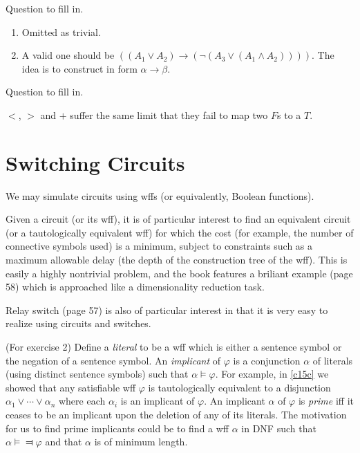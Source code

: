 \begin{exercise}
  Question to fill in.
\end{exercise}

\begin{enumerate}[label=(\alph*)]
  \item Omitted as trivial.
  \item A valid one should be $((A_1\vee A_2)\rightarrow(\neg(A_3\vee(A_1\wedge A_2))))$. The idea is to construct in form $\alpha\rightarrow \beta$.
\end{enumerate}

\begin{exercise}
  Question to fill in.
\end{exercise}

$<$, $>$ and $+$ suffer the same limit that they fail to map two $F$s to a $T$.

\section{Switching Circuits}

We may simulate circuits using wffs (or equivalently, Boolean functions).

Given a circuit (or its wff), it is of particular interest to find an equivalent circuit (or a tautologically equivalent wff) for which the cost (for example, the number of connective symbols used) is a minimum, subject to constraints such as a maximum allowable delay (the depth of the construction tree of the wff). This is easily a highly nontrivial problem, and the book features a briliant example (page 58) which is approached like a dimensionality reduction task.

Relay switch (page 57) is also of particular interest in that it is very easy to realize using circuits and switches.

(For exercise 2) Define a \textit{literal} to be a wff which is either a sentence symbol or the negation of a sentence symbol. An \textit{implicant} of $\varphi$ is a conjunction $\alpha$ of literals (using distinct sentence symbols) such that $\alpha\vDash \varphi$. For example, in \ref{c15c} we showed that any satisfiable wff $\varphi$ is tautologically equivalent to a disjunction $\alpha_1\vee\cdots\vee \alpha_n$ where each $\alpha_i$ is an implicant of $\varphi$. An implicant $\alpha$ of $\varphi$ is \textit{prime} iff it ceases to be an implicant upon the deletion of any of its literals. The motivation for us to find prime implicants could be to find a wff $\alpha$ in DNF such that $\alpha\vDash\Dashv \varphi$ and that $\alpha$ is of minimum length.

